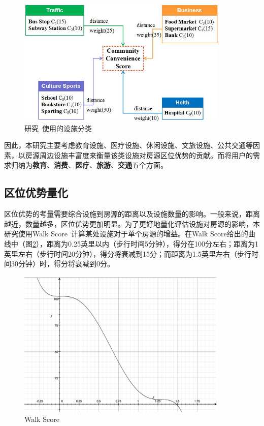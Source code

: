 \documentclass{article}
\begin{document}
\begin{figure}[htbp]
\centering
\includegraphics[width=0.9\textwidth]{./pic/设施分类.jpg}
\caption{研究~\cite{poi分类}使用的设施分类}
\label{设施分类}
\end{figure}

因此，本研究主要考虑教育设施、医疗设施、休闲设施、文旅设施、公共交通等因素，以房源周边设施丰富度来衡量该类设施对房源区位优势的贡献。而将用户的需求归纳为\textbf{教育}、\textbf{消费}、\textbf{医疗}、\textbf{旅游}、\textbf{交通}五个方面。

\subsection{区位优势量化}

区位优势的考量需要综合设施到房源的距离以及设施数量的影响。一般来说，距离越近，数量越多，区位优势更加明显。为了更好地量化评估设施对房源的影响，本研究使用Walk Score~\cite{walk}计算某处设施对于单个房源的增益。在Walk Score给出的曲线中（图\ref{walk score}），距离为0.25英里以内（步行时间5分钟），得分在100分左右；距离为1英里左右（步行时间20分钟），得分将衰减到15分；而距离为1.5英里左右（步行时间30分钟）时，得分将衰减到0分。

\begin{figure}[htbp]
\centering
\includegraphics[width=0.9\textwidth]{./pic/walk score.png}
\caption{Walk Score}
\label{walk score}
\end{figure}
\end{document}
